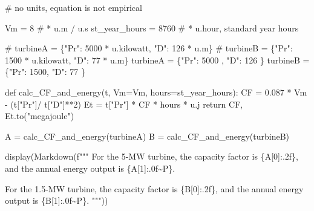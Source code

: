 \documentclass[
  letterpaper,
  DIV=11,
  numbers=noendperiod]{scrartcl}
\newenvironment{Shaded}{\begin{snugshade}}{\end{snugshade}}
\newcommand{\CommentTok}[1]{\textcolor[rgb]{0.37,0.37,0.37}{#1}}
\newcommand{\ControlFlowTok}[1]{\textcolor[rgb]{0.00,0.23,0.31}{#1}}
\newcommand{\DecValTok}[1]{\textcolor[rgb]{0.68,0.00,0.00}{#1}}
\newcommand{\ErrorTok}[1]{\textcolor[rgb]{0.68,0.00,0.00}{#1}}
\newcommand{\FloatTok}[1]{\textcolor[rgb]{0.68,0.00,0.00}{#1}}
\newcommand{\KeywordTok}[1]{\textcolor[rgb]{0.00,0.23,0.31}{#1}}
\newcommand{\NormalTok}[1]{\textcolor[rgb]{0.00,0.23,0.31}{#1}}
\newcommand{\OperatorTok}[1]{\textcolor[rgb]{0.37,0.37,0.37}{#1}}
\newcommand{\SpecialCharTok}[1]{\textcolor[rgb]{0.37,0.37,0.37}{#1}}
\newcommand{\SpecialStringTok}[1]{\textcolor[rgb]{0.13,0.47,0.30}{#1}}
\newcommand{\StringTok}[1]{\textcolor[rgb]{0.13,0.47,0.30}{#1}}
\begin{document}
\begin{Shaded}
\begin{Highlighting}[]
\CommentTok{\# no units, equation is not empirical}

\NormalTok{Vm }\OperatorTok{=} \DecValTok{8} \CommentTok{\# * u.m / u.s}
\NormalTok{st\_year\_hours }\OperatorTok{=} \DecValTok{8760} \CommentTok{\# * u.hour, standard year hours }

\CommentTok{\# turbineA = \{"Pr": 5000 * u.kilowatt, "D": 126 * u.m\}}
\CommentTok{\# turbineB = \{"Pr": 1500 * u.kilowatt, "D": 77 * u.m\}}
\NormalTok{turbineA }\OperatorTok{=}\NormalTok{ \{}\StringTok{"Pr"}\NormalTok{: }\DecValTok{5000}\NormalTok{ , }\StringTok{"D"}\NormalTok{: }\DecValTok{126}\NormalTok{ \}}
\NormalTok{turbineB }\OperatorTok{=}\NormalTok{ \{}\StringTok{"Pr"}\NormalTok{: }\DecValTok{1500}\NormalTok{, }\StringTok{"D"}\NormalTok{: }\DecValTok{77}\NormalTok{ \}}

\KeywordTok{def}\NormalTok{ calc\_CF\_and\_energy(t, Vm}\OperatorTok{=}\NormalTok{Vm, hours}\OperatorTok{=}\NormalTok{st\_year\_hours):}
\NormalTok{    CF }\OperatorTok{=} \FloatTok{0.087} \OperatorTok{*}\NormalTok{ Vm }\OperatorTok{{-}}\NormalTok{ (t[}\StringTok{"Pr"}\NormalTok{]}\OperatorTok{/}\NormalTok{ t[}\StringTok{"D"}\NormalTok{]}\OperatorTok{**}\DecValTok{2}\NormalTok{)}
\NormalTok{    Et }\OperatorTok{=}\NormalTok{ t[}\StringTok{"Pr"}\NormalTok{] }\OperatorTok{*}\NormalTok{ CF }\OperatorTok{*}\NormalTok{ hours }\OperatorTok{*}\NormalTok{ u.j}
    \ControlFlowTok{return}\NormalTok{ CF, Et.to(}\StringTok{"megajoule"}\NormalTok{)}

\NormalTok{A }\OperatorTok{=}\NormalTok{ calc\_CF\_and\_energy(turbineA)}
\NormalTok{B }\OperatorTok{=}\NormalTok{ calc\_CF\_and\_energy(turbineB)}


\NormalTok{display(Markdown(}\SpecialStringTok{f"""}
\SpecialStringTok{For the 5{-}MW turbine, the capacity factor is   }\SpecialCharTok{\{}\NormalTok{A[}\DecValTok{0}\NormalTok{]}\SpecialCharTok{:.2f\}}\SpecialStringTok{, and the annual energy output is  }\SpecialCharTok{\{}\NormalTok{A[}\DecValTok{1}\NormalTok{]}\SpecialCharTok{:}\FloatTok{.0}\ErrorTok{f}\OperatorTok{\textasciitilde{}}\NormalTok{P}\SpecialCharTok{\}}\SpecialStringTok{.}

\SpecialStringTok{For the 1.5{-}MW turbine, the capacity factor is   }\SpecialCharTok{\{}\NormalTok{B[}\DecValTok{0}\NormalTok{]}\SpecialCharTok{:.2f\}}\SpecialStringTok{, and the annual energy output is  }\SpecialCharTok{\{}\NormalTok{B[}\DecValTok{1}\NormalTok{]}\SpecialCharTok{:}\FloatTok{.0}\ErrorTok{f}\OperatorTok{\textasciitilde{}}\NormalTok{P}\SpecialCharTok{\}}\SpecialStringTok{.}
\SpecialStringTok{"""}\NormalTok{))}
\end{Highlighting}
\end{Shaded}
\end{document}
